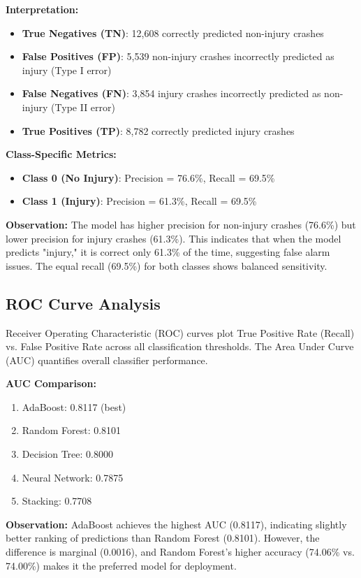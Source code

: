 \documentclass[12pt,man]{apa7}
\begin{document}
\textbf{Interpretation:}
\begin{itemize}
    \item \textbf{True Negatives (TN)}: 12,608 correctly predicted non-injury crashes
    \item \textbf{False Positives (FP)}: 5,539 non-injury crashes incorrectly predicted as injury (Type I error)
    \item \textbf{False Negatives (FN)}: 3,854 injury crashes incorrectly predicted as non-injury (Type II error)
    \item \textbf{True Positives (TP)}: 8,782 correctly predicted injury crashes
\end{itemize}

\textbf{Class-Specific Metrics:}
\begin{itemize}
    \item \textbf{Class 0 (No Injury)}: Precision = 76.6\%, Recall = 69.5\%
    \item \textbf{Class 1 (Injury)}: Precision = 61.3\%, Recall = 69.5\%
\end{itemize}

\textbf{Observation:} The model has higher precision for non-injury crashes (76.6\%) but lower precision for injury crashes (61.3\%). This indicates that when the model predicts "injury," it is correct only 61.3\% of the time, suggesting false alarm issues. The equal recall (69.5\%) for both classes shows balanced sensitivity.

\subsection{ROC Curve Analysis}

Receiver Operating Characteristic (ROC) curves plot True Positive Rate (Recall) vs. False Positive Rate across all classification thresholds. The Area Under Curve (AUC) quantifies overall classifier performance.

\textbf{AUC Comparison:}
\begin{enumerate}
    \item AdaBoost: 0.8117 (best)
    \item Random Forest: 0.8101
    \item Decision Tree: 0.8000
    \item Neural Network: 0.7875
    \item Stacking: 0.7708
\end{enumerate}

\textbf{Observation:} AdaBoost achieves the highest AUC (0.8117), indicating slightly better ranking of predictions than Random Forest (0.8101). However, the difference is marginal (0.0016), and Random Forest's higher accuracy (74.06\% vs. 74.00\%) makes it the preferred model for deployment.
\end{document}
